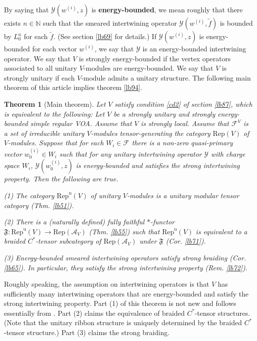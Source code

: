 \documentclass[12pt,a4paper]{article}
\theoremstyle{definition}
\theoremstyle{plain}
\newtheorem{thmn}{Theorem}
\newcommand{\fk}{\mathfrak}
\newcommand{\mc}{\mathcal}
\newcommand{\wtd}{\widetilde}
\newcommand{\Rep}{\mathrm{Rep}}
\newcommand{\RepV}{\mathrm{Rep}(V)}
\newcommand{\RepuV}{\mathrm{Rep}^{\mathrm u}(V)}
\newcommand{\mbb}{\mathbb}
\numberwithin{equation}{subsection}
\begin{document}
By saying that $\mc Y(w^{(i)},z)$ is \textbf{energy-bounded}, we mean roughly that there exists $n\in\mbb N$ such that the smeared intertwining operator $\mc Y(w^{(i)},\wtd f)$ is bounded by $L_0^n$ for each $\wtd f$. (See section \ref{lb69} for details.) If $\mc Y(w^{{(i)}},z)$ is energy-bounded for each vector $w^{(i)}$, we say that $\mc Y$ is an energy-bounded intertwining operator. We say that $V$ is strongly energy-bounded if the vertex operators associated to all unitary $V$-modules  are energy-bounded. We say that $V$ is strongly unitary if each $V$-module admits a unitary structure. The following main theorem of this article implies theorem \ref{lb94}.

\begin{thmn}[Main theorem]\label{lb73}	Let $V$ satisfy condition \ref{cd2} of section \ref{lb87}, which is equivalent to the following: Let $V$ be a strongly unitary and strongly energy-bounded simple regular VOA. Assume that $V$ is strongly local. Assume that $\mc F^V$ is a set of irreducible unitary $V$-modules tensor-generating the category $\RepV$ of $V$-modules. Suppose that for each $W_i\in\mc F$ there is a non-zero quasi-primary vector $w^{(i)}_0\in W_i$ such that for any unitary intertwining operator $\mc Y$ with charge space $W_i$, $\mc Y(w^{(i)}_0,z)$ is energy-bounded and satisfies the strong intertwining property. Then the following are true.
	
(1) The category $\RepuV$ of unitary $V$-modules is a unitary modular tensor category (Thm. \ref{lb51}).
	
(2) There is a (naturally defined) fully faithful $*$-functor $\fk F:\RepuV\rightarrow\Rep(\mc A_V)$ (Thm. \ref{lb55}) such that $\RepuV$ is equivalent to a braided $C^*$-tensor subcategory of $\Rep(\mc A_V)$ under $\fk F$ (Cor. \ref{lb71}).
	
(3) Energy-bounded smeared intertwining operators satisfy strong braiding (Cor. \ref{lb65}). In particular, they satisfy the strong intertwining property (Rem. \ref{lb72}).
\end{thmn}

Roughly speaking, the assumption on intertwining operators is that $V$ has sufficiently many intertwining operators that are energy-bounded and satisfy the strong intertwining property. Part (1) of this theorem is not new and follows essentially from \cite{Gui19a,Gui19b}. Part (2) claims the equivalence of braided $C^*$-tensor structures. (Note that the unitary ribbon structure is uniquely determined by the  braided $C^*$-tensor structure.) Part (3) claims the strong braiding.
\end{document}
